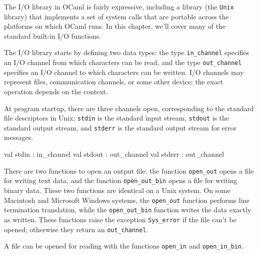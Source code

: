 %
%
%


The I/O library in OCaml is fairly expressive, including a library (the \hbox{\lstinline$Unix$}
library) that implements a set of system calls that are portable across the platforms on which OCaml
runs. In this chapter, we'll cover many of the standard built-in I/O functions.

The I/O library starts by defining two data types: the type \hbox{\lstinline/in_channel/} specifies
an I/O channel from which characters can be read, and the type \hbox{\lstinline/out_channel/}
specifies an I/O channel to which characters can be written.  I/O channels may represent files,
communication channels, or some other device; the exact operation depends on the context.

At program startup, there are three channels open, corresponding to the standard file descriptors in
Unix; \hbox{\lstinline/stdin/} is the standard input stream, \hbox{\lstinline/stdout/} is the standard output
stream, and \hbox{\lstinline/stderr/} is the standard output stream for error messages.


\begin{ocaml}
val stdin  : in_channel
val stdout : out_channel
val stderr : out_channel
\end{ocaml}


There are two functions to open an output file: the function \hbox{\lstinline/open_out/} opens a
file for writing text data, and the function \hbox{\lstinline/open_out_bin/} opens a file for
writing binary data. These two functions are identical on a Unix system.  On some Macintosh and Microsoft Windows
systems, the \hbox{\lstinline/open_out/} function performs line termination
translation, while the \hbox{\lstinline/open_out_bin/} function writes the data exactly as
written.  These functions raise the exception \hbox{\lstinline/Sys_error/} if the file can't be
opened; otherwise they return an \hbox{\lstinline/out_channel/}.

A file can be opened for reading with the functions \hbox{\lstinline/open_in/} and
\hbox{\lstinline/open_in_bin/}.

